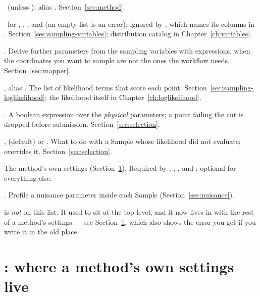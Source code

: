 \begin{keylist}
  \item[Method] \req\ (unless ); alias .
        Section~\ref{sec:method}.
  \item[Variables] \req\ for , , , and
         (an empty list is an error); ignored by ,
        which names its columns in .
        Section~\ref{sec:sampling-variables}; distribution catalog in
        Chapter~\ref{ch:variables}.
  \item[Mapper] \opt. Derive further parameters from the sampling variables with
        expressions, when the coordinates you want to sample are not the ones the
        workflow needs. Section~\ref{sec:mapper}.
  \item[LogLikelihood] \opt, alias . The list of likelihood terms
        that score each point. Section~\ref{sec:sampling-loglikelihood}; the likelihood
        itself in Chapter~\ref{ch:loglikelihood}.
  \item[selection] \opt. A boolean expression over the \emph{physical} parameters; a
        point failing the cut is dropped before submission.
        Section~\ref{sec:selection}.
  \item[on\_failure] \opt,  (default) or . What to do with a
        Sample whose likelihood did not evaluate;  overrides
        it. Section~\ref{sec:selection}.
  \item[Bounds] The method's own settings (Section~\ref{sec:bounds}). Required by
        , , , and
        ; optional for everything else.
  \item[Nuisance] \opt. Profile a nuisance parameter inside each Sample
        (Section~\ref{sec:nuisance}).
\end{keylist}

\begin{jnote}
 is \emph{not} on this list. It used to sit at the top level, and it now
lives in  with the rest of a method's settings --- see
Section~\ref{sec:bounds}, which also shows the error you get if you write it in the old
place.
\end{jnote}

\section{: where a method's own settings live}
\label{sec:bounds}

